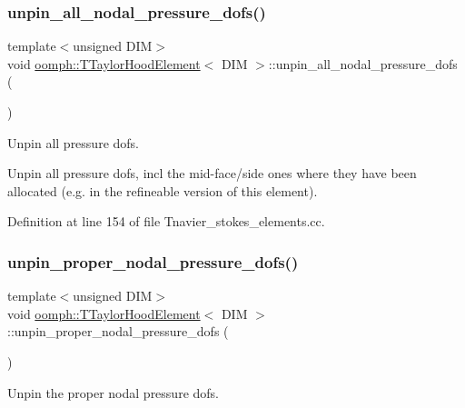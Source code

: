 \subsubsection{\texorpdfstring{unpin\+\_\+all\+\_\+nodal\+\_\+pressure\+\_\+dofs()}{unpin\_all\_nodal\_pressure\_dofs()}}
{\footnotesize\ttfamily template$<$unsigned D\+IM$>$ \\
void \hyperlink{classoomph_1_1TTaylorHoodElement}{oomph\+::\+T\+Taylor\+Hood\+Element}$<$ D\+IM $>$\+::unpin\+\_\+all\+\_\+nodal\+\_\+pressure\+\_\+dofs (\begin{DoxyParamCaption}{ }\end{DoxyParamCaption})\hspace{0.3cm}{\ttfamily [protected]}}



Unpin all pressure dofs. 

Unpin all pressure dofs, incl the mid-\/face/side ones where they have been allocated (e.\+g. in the refineable version of this element). 

Definition at line 154 of file Tnavier\+\_\+stokes\+\_\+elements.\+cc.

\mbox{\label{classoomph_1_1TTaylorHoodElement_a3472c28aa1ce10f4a2cb754b78681b3f}} 
\subsubsection{\texorpdfstring{unpin\+\_\+proper\+\_\+nodal\+\_\+pressure\+\_\+dofs()}{unpin\_proper\_nodal\_pressure\_dofs()}}
{\footnotesize\ttfamily template$<$unsigned D\+IM$>$ \\
void \hyperlink{classoomph_1_1TTaylorHoodElement}{oomph\+::\+T\+Taylor\+Hood\+Element}$<$ D\+IM $>$\+::unpin\+\_\+proper\+\_\+nodal\+\_\+pressure\+\_\+dofs (\begin{DoxyParamCaption}{ }\end{DoxyParamCaption})\hspace{0.3cm}{\ttfamily [protected]}}



Unpin the proper nodal pressure dofs. 

